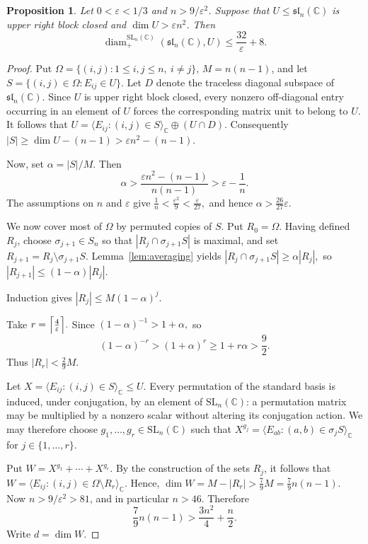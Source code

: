 \documentclass[11pt]{article}
\newtheorem{proposition}[theorem]{Proposition}
\theoremstyle{remark}
\newcommand{\C}{\mathbb C}
\begin{document}
\begin{proposition}\label{prop:corrected53}
Let $0<\varepsilon<1/3$ and $n>9/\varepsilon^2$.  Suppose that
$U\leq\mathfrak{sl}_n(\C)$ is upper right block closed and
$\dim U>\varepsilon n^2$.  Then
\[
 \operatorname{diam}^{\mathrm{SL}_n(\C)}_{+}
 (\mathfrak{sl}_n(\C),U)
 \leq \frac{32}{\varepsilon}+8.
\]
\end{proposition}

\begin{proof}
Put $\Omega=\{(i,j):1\leq i,j\leq n,\ i\neq j\}$, $M=n(n-1)$, and let $S=\{(i,j)\in\Omega:E_{ij}\in U\}.$
Let $D$ denote the traceless diagonal subspace of
$\mathfrak{sl}_n(\C)$.  Since $U$ is upper right block closed, every nonzero
off-diagonal entry occurring in an element of $U$ forces the corresponding
matrix unit to belong to $U$.  It follows that $U=\langle E_{ij}:(i,j)\in S\rangle_{\C}\oplus(U\cap D).$
Consequently $|S|\geq \dim U-(n-1)>\varepsilon n^2-(n-1).$

Now, set $\alpha=|S|/M$.  Then
\[
 \alpha>
 \frac{\varepsilon n^2-(n-1)}{n(n-1)}
 >\varepsilon-\frac1n.
\]
The assumptions on $n$ and $\varepsilon$ give $\frac1n<\frac{\varepsilon^2}{9}<\frac{\varepsilon}{27},$
and hence $\alpha>\frac{26}{27}\varepsilon.$


We now cover most of $\Omega$ by permuted copies of $S$.  Put
$R_0=\Omega$.  Having defined $R_j$, choose $\sigma_{j+1}\in S_n$ so that
$|R_j\cap\sigma_{j+1}S|$ is maximal, and set $R_{j+1}=R_j\setminus\sigma_{j+1}S.$
Lemma~\ref{lem:averaging} yields $|R_j\cap\sigma_{j+1}S|\geq \alpha |R_j|,$
so $|R_{j+1}|\leq(1-\alpha)|R_j|.$

Induction gives $|R_j|\leq M(1-\alpha)^j.$


Take $r=\Bigl\lceil\frac4\varepsilon\Bigr\rceil.$
Since $(1-\alpha)^{-1}>1+\alpha,$ so
\[
 (1-\alpha)^{-r}>(1+\alpha)^r\geq1+r\alpha
 >\frac92.
\]
Thus $|R_r|<\frac29M.$


Let $X=\langle E_{ij}:(i,j)\in S\rangle_{\C}\leq U.$
Every permutation of the standard basis is induced, under conjugation, by
an element of $\mathrm{SL}_n(\C)$: a permutation matrix may be multiplied by
a nonzero scalar without altering its conjugation action.  We may therefore
choose $g_1,\ldots,g_r\in\mathrm{SL}_n(\C)$ such that $X^{g_j}
 =\langle E_{ab}:(a,b)\in\sigma_jS\rangle_{\C}$ for $j \in \{1, \ldots, r\}$.
 
Put $W=X^{g_1}+\cdots+X^{g_r}.$
By the construction of the sets $R_j$, it follows that $W=\langle E_{ij}:(i,j)\in\Omega\setminus R_r\rangle_{\C}.$
Hence, $\dim W=M-|R_r|>\frac79M=\frac79n(n-1).$
Now $n>9/\varepsilon^2>81$, and in particular $n>46$.  Therefore
\[
 \frac79n(n-1)>\frac{3n^2}{4}+\frac n2.
\]
Write $d=\dim W$.


\end{proof}
\end{document}
